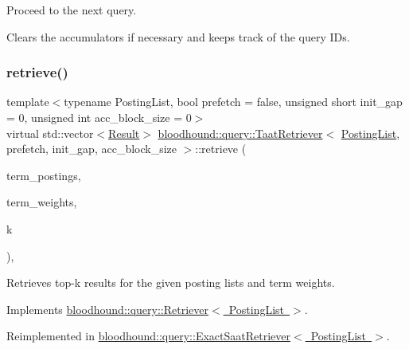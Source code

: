 Proceed to the next query.

Clears the accumulators if necessary and keeps track of the query I\+Ds. \mbox{\label{classbloodhound_1_1query_1_1TaatRetriever_a58284f19458689021a083c07ea627485}} 
\subsubsection{\texorpdfstring{retrieve()}{retrieve()}}
{\footnotesize\ttfamily template$<$typename Posting\+List, bool prefetch = false, unsigned short init\+\_\+gap = 0, unsigned int acc\+\_\+block\+\_\+size = 0$>$ \\
virtual std\+::vector$<$\mbox{\hyperlink{structbloodhound_1_1query_1_1Result}{Result}}$>$ \mbox{\hyperlink{classbloodhound_1_1query_1_1TaatRetriever}{bloodhound\+::query\+::\+Taat\+Retriever}}$<$ \mbox{\hyperlink{classbloodhound_1_1PostingList}{Posting\+List}}, prefetch, init\+\_\+gap, acc\+\_\+block\+\_\+size $>$\+::retrieve (\begin{DoxyParamCaption}\item[{const std\+::vector$<$ \mbox{\hyperlink{classbloodhound_1_1PostingList}{Posting\+List}} $>$ \&}]{term\+\_\+postings,  }\item[{const std\+::vector$<$ \mbox{\hyperlink{structbloodhound_1_1Score}{Score}} $>$ \&}]{term\+\_\+weights,  }\item[{std\+::size\+\_\+t}]{k }\end{DoxyParamCaption})\hspace{0.3cm}{\ttfamily [inline]}, {\ttfamily [virtual]}}



Retrieves top-\/k results for the given posting lists and term weights. 



Implements \mbox{\hyperlink{classbloodhound_1_1query_1_1Retriever_ae3c6a4628c5580e620c213b3dcd47c2b}{bloodhound\+::query\+::\+Retriever$<$ Posting\+List $>$}}.



Reimplemented in \mbox{\hyperlink{classbloodhound_1_1query_1_1ExactSaatRetriever_aced2763cc2a4c12838fef4a20759049e}{bloodhound\+::query\+::\+Exact\+Saat\+Retriever$<$ Posting\+List $>$}}.

